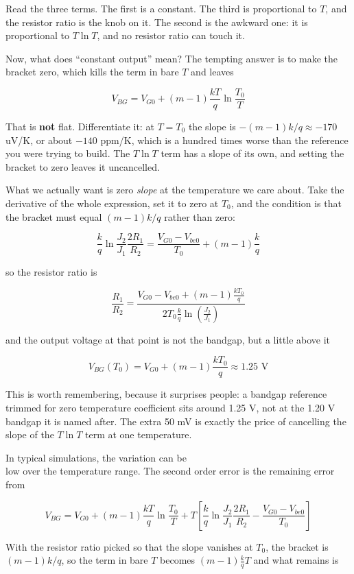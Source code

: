Read the three terms. The first is a constant. The third is proportional
to \(T\), and the resistor ratio is the knob on it. The second is the
awkward one: it is proportional to \(T\ln{T}\), and no resistor ratio
can touch it.

Now, what does ``constant output'' mean? The tempting answer is to make
the bracket zero, which kills the term in bare \(T\) and leaves

\[ V_{BG} = V_{G0} + (m-1)\frac{kT}{q}\ln{\frac{T_0}{T}} \]

That is \textbf{not} flat. Differentiate it: at \(T = T_0\) the slope is
\(-(m-1)k/q \approx -170\) uV/K, or about \(-140\) ppm/K, which is a
hundred times worse than the reference you were trying to build. The
\(T\ln{T}\) term has a slope of its own, and setting the bracket to zero
leaves it uncancelled.

What we actually want is zero \emph{slope} at the temperature we care
about. Take the derivative of the whole expression, set it to zero at
\(T_0\), and the condition is that the bracket must equal \((m-1)k/q\)
rather than zero:

\[ \frac{k}{q}\ln{\frac{J_2}{J_1}}\frac{2R_1}{R_2} = \frac{V_{G0}-V_{be0}}{T_0} + (m-1)\frac{k}{q} \]

so the resistor ratio is

\[ \frac{R_1}{R_2} = \frac{V_{G0} - V_{be0} + (m-1)\frac{kT_0}{q}}{2 T_0 \frac{k}{q}\ln(\frac{J_2}{J_1})} \]

and the output voltage at that point is not the bandgap, but a little
above it

\[ V_{BG}(T_0) = V_{G0} + (m-1)\frac{kT_0}{q} \approx 1.25 \text{ V} \]

This is worth remembering, because it surprises people: a bandgap
reference trimmed for zero temperature coefficient sits around 1.25 V,
not at the 1.20 V bandgap it is named after. The extra 50 mV is exactly
the price of cancelling the slope of the \(T\ln{T}\) term at one
temperature.

In typical simulations, the variation can be\\
low over the temperature range. The second order error is the remaining
error from

\[ V_{BG} = V_{G0} + (m-1)\frac{kT}{q}\ln{\frac{T_0}{T}} +T\left[\frac{k}{q}\ln{\frac{J_2}{J_1}}\frac{2R_1}{R_2} - \frac{V_{G0}- V_{be0}}{T_0}\right] \]

With the resistor ratio picked so that the slope vanishes at \(T_0\),
the bracket is \((m-1)k/q\), so the term in bare \(T\) becomes
\((m-1)\frac{k}{q}T\) and what remains is


